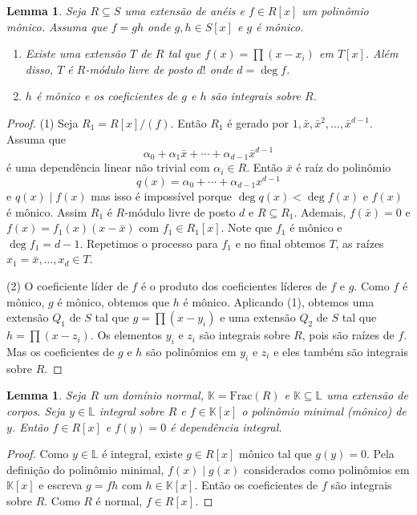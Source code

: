 \documentclass[12pt]{amsart}
\renewcommand{\L}{\mathbb L}
\newcommand{\K}{\mathbb K}
\newcommand{\fracf}[1]{\mbox{Frac}(#1)}
\newtheorem{lemma}[theorem]{Lemma}
\begin{document}
\begin{lemma}\label{lem:coef_int}
    Seja $R\subseteq S$ uma extensão de anéis e $f\in R[x]$ um polinômio mônico. Assuma que 
    $f=gh$ onde $g,h\in S[x]$ e $g$ é mônico. 
    \begin{enumerate}
        \item Existe uma extensão $T$ de $R$ tal que $f(x)=\prod (x-x_i)$ em $T[x]$. Além disso, $T$ é $R$-módulo livre de posto $d!$ onde $d=\deg f$.
        \item $h$ é mônico e os coeficientes de $g$ e $h$ são integrais sobre $R$.
    \end{enumerate}
\end{lemma}
\begin{proof}
    (1) Seja $R_1=R[x]/(f)$. Então $R_1$ é gerado por $1,\bar x,\bar x^2,\ldots,\bar x^{d-1}$.
    Assuma que 
    \[
        \alpha_0+\alpha_1\bar x+\cdots+\alpha_{d-1}\bar x^{d-1}
    \]
    é uma dependência linear não trivial com $\alpha_i\in R$. Então $\bar x$ é raíz do polinômio 
    \[
        q(x)=\alpha_0+\cdots+\alpha_{d-1}x^{d-1}
    \]
    e $q(x)\mid f(x)$ mas isso é impossível porque $\deg q(x)<\deg f(x)$ e $f(x)$ é mônico.
    Assim $R_1$ é $R$-módulo livre de posto $d$ e $R\subseteq R_1$. 
    Ademais, $f(\bar x)=0$ e $f(x)=f_1(x)(x-\bar x)$ com $f_1\in R_1[x]$. Note que $f_1$ é mônico e 
    $\deg{f_1}=d-1$. Repetimos o processo para $f_1$  e no final obtemos $T$, 
    as raízes $x_1=\bar x,\ldots,x_d\in T$. 

    (2) O coeficiente líder de $f$ é o produto dos coeficientes líderes de $f$ e $g$. Como $f$ é mônico, $g$ é mônico, obtemos que $h$ é mônico. Aplicando (1), obtemos uma extensão $Q_1$ de $S$ tal que 
    $g=\prod (x-y_i)$ e uma extensão $Q_2$ de $S$ tal que $h=\prod(x-z_i)$. Os elementos $y_i$ e $z_i$ são integrais sobre $R$, pois são raízes de $f$. Mas os coeficientes de $g$ e $h$ são polinômios em 
    $y_i$ e $z_i$ e eles também são integrais sobre $R$. 
\end{proof}

\begin{lemma}
    Seja $R$ um domínio normal, $\K=\fracf R$ e $\K\subseteq \L$ uma extensão de corpos. 
    Seja $y\in\L$ integral sobre $R$ e $f\in\K[x]$ o polinômio  minimal (mônico) de $y$. Então $f\in R[x]$ 
    e $f(y)=0$ é dependência integral.  
\end{lemma}
\begin{proof}
    Como $y\in \L$ é integral, existe $g\in R[x]$ mônico tal que $g(y)=0$. 
    Pela definição do polinômio minimal, $f(x)\mid g(x)$ considerados como 
    polinômios em $\K[x]$ e escreva $g=fh$ com $h\in \K[x]$. Então os coeficientes de $f$ são integrais sobre $R$. Como $R$ é normal, $f\in R[x]$. 
\end{proof}
\end{document}
